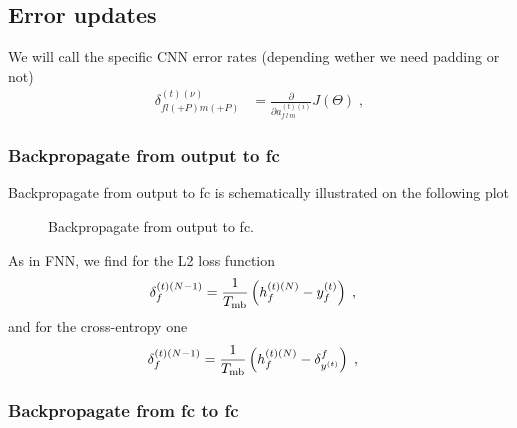 \subsection{Error updates}

We will call the specific CNN error rates (depending wether we need padding or not)
\begin{align}
\delta^{(t)(\nu)}_{fl(+P)m(+P)}&=\frac{\partial }{\partial a_{f\,l\,m}^{(t)(i)}}J(\Theta)\;,
\end{align}


\subsubsection{Backpropagate from output to fc}

Backpropagate from output to fc is schematically illustrated on the following plot

\begin{figure}[H]
\begin{center}
\caption{Backpropagate from output to fc.}
\end{center}
\end{figure}
As in FNN, we find for the L2 loss function
\begin{align}
\delta^{(t)(N-1)}_f&= \frac{1}{T_{{\rm mb}}}\left(h_{f}^{(t)(N)}-y_f^{(t)}\right)\;,
\end{align}
and for the cross-entropy one
\begin{align}
\delta^{(t)(N-1)}_f&= \frac{1}{T_{{\rm mb}}}\left(h_{f}^{(t)(N)}-\delta_{y^{(t)}}^f\right)\;,
\end{align}

\subsubsection{Backpropagate from fc to fc}

